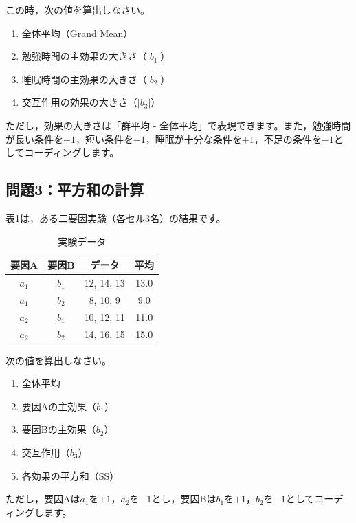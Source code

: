 \documentclass{ltjbook}
\begin{document}
この時，次の値を算出しなさい。

\begin{enumerate}
	\item 全体平均（Grand Mean）
	\item 勉強時間の主効果の大きさ（$|b_1|$）
	\item 睡眠時間の主効果の大きさ（$|b_2|$）
	\item 交互作用の効果の大きさ（$|b_3|$）
\end{enumerate}

ただし，効果の大きさは「群平均 - 全体平均」で表現できます。また，勉強時間が長い条件を$+1$，短い条件を$-1$，睡眠が十分な条件を$+1$，不足の条件を$-1$としてコーディングします。

\subsection{問題3：平方和の計算}

表\ref{tbl:18_09}は，ある二要因実験（各セル3名）の結果です。

\begin{table}[ht]
	\centering
	\caption{実験データ}
	\begin{tabular}{cccc}
		\hline
		要因A  & 要因B  & データ          & 平均   \\ \hline
		$a_1$ & $b_1$ & 12, 14, 13   & 13.0 \\
		$a_1$ & $b_2$ & 8, 10, 9     & 9.0  \\
		$a_2$ & $b_1$ & 10, 12, 11   & 11.0 \\
		$a_2$ & $b_2$ & 14, 16, 15   & 15.0 \\ \hline
	\end{tabular}
	\label{tbl:18_09}
\end{table}

次の値を算出しなさい。

\begin{enumerate}
	\item 全体平均
	\item 要因Aの主効果（$b_1$）
	\item 要因Bの主効果（$b_2$）
	\item 交互作用（$b_3$）
	\item 各効果の平方和（SS）
\end{enumerate}

ただし，要因Aは$a_1$を$+1$，$a_2$を$-1$とし，要因Bは$b_1$を$+1$，$b_2$を$-1$としてコーディングします。
\end{document}
